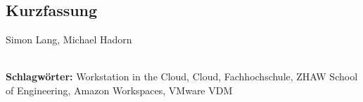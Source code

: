 
\subsection*{Kurzfassung}

Simon Lang, Michael Hadorn


%
\mbox{}\\[0.5\baselineskip]\noindent
\textbf{Schlagwörter:} 
Workstation in the Cloud, Cloud, Fachhochschule, ZHAW School of Engineering, Amazon Workspaces, VMware VDM
